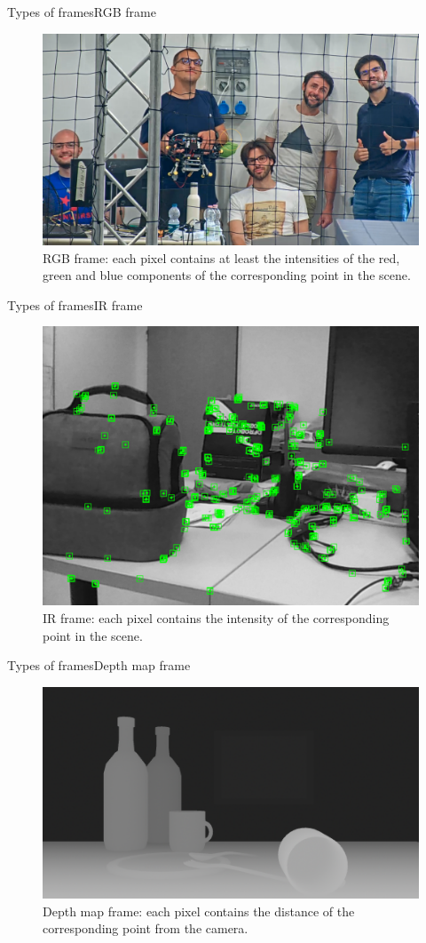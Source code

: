 \begin{frame}{Types of frames}{RGB frame}
	\begin{figure}
		\centering
		\includegraphics[width=.63\textwidth]{rgb}
		\caption{RGB frame: each pixel contains at least the intensities of the red, green and blue components of the corresponding point in the scene.}
		\label{fig:rgb}
	\end{figure}
\end{frame}
\begin{frame}{Types of frames}{IR frame}
	\begin{figure}
		\centering
		\includegraphics[width=.5\textwidth]{ir}
		\caption{IR frame: each pixel contains the intensity of the corresponding point in the scene.}
		\label{fig:ir}
	\end{figure}
\end{frame}
\begin{frame}{Types of frames}{Depth map frame}
	\begin{figure}
		\centering
		\includegraphics[width=.68\textwidth]{depthmap}
		\caption{Depth map frame: each pixel contains the distance of the corresponding point from the camera.}
		\label{fig:depthmap}
	\end{figure}
\end{frame}

